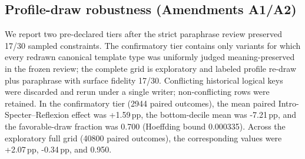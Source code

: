 \subsection{Profile-draw robustness (Amendments A1/A2)}
We report two pre-declared tiers after the strict paraphrase review preserved 17/30 sampled constraints. The confirmatory tier contains only variants for which every redrawn canonical template type was uniformly judged meaning-preserved in the frozen review; the complete grid is exploratory and labeled profile re-draw plus paraphrase with surface fidelity 17/30. Conflicting historical logical keys were discarded and rerun under a single writer; non-conflicting rows were retained. In the confirmatory tier (2944 paired outcomes), the mean paired Intro-Specter--Reflexion effect was +1.59\,pp, the bottom-decile mean was -7.21\,pp, and the favorable-draw fraction was 0.700 (Hoeffding bound 0.000335). Across the exploratory full grid (40800 paired outcomes), the corresponding values were +2.07\,pp, -0.34\,pp, and 0.950.
